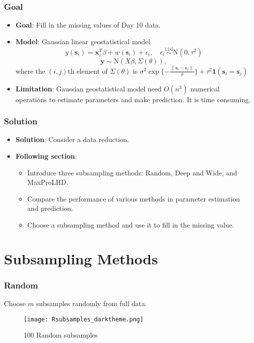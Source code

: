\documentclass{beamer}
\begin{document}
\begin{frame}
\frametitle{Goal}
\begin{itemize}
\item \textbf{Goal}: Fill in the missing values of Day 10 data.
\item \textbf{Model}: Gaussian linear geostatistical model
\begin{equation*}
y(\mathbf{s}_i)=\mathbf{x}_i^T\beta+w(\mathbf{s}_i)+\epsilon_i,\quad\epsilon_i\stackrel{\text{i.i.d}}{\sim}\mathrm{N}(0,\tau^2)
\end{equation*}
\begin{equation*}
\mathbf{y}\sim\mathrm{N}(X\beta,\Sigma(\theta)),
\end{equation*}
where the $(i,j)$th element of $\Sigma(\theta)$ is $\sigma^2\exp{\{-\frac{\|\mathbf{s}_i-\mathbf{s}_j\|}{\phi}\}}+\tau^2\mathbf{1}(\mathbf{s}_i=\mathbf{s}_j)$
\item \textbf{Limitation}: Gaussian geostatistical model need $O(n^3)$ numerical operations to estimate parameters and make prediction. It is time consuming.
\end{itemize}
\end{frame}

\begin{frame}
\frametitle{Solution}
\begin{itemize}
\item \textbf{Solution}: Consider a data reduction.
\item \textbf{Following section}:
\begin{itemize}
\item Introduce three subsampling methods: Random, Deep and Wide, and MaxProLHD.
\item Compare the performance of various methods in parameter estimation and prediction.
\item Choose a subsampling method and use it to fill in the missing value.
\end{itemize}
\end{itemize}
\end{frame}

\section{Subsampling Methods}
\begin{frame}
\frametitle{Random}
Choose $m$ subsamples randomly from full data.
\begin{figure}
\centering
\texttt{[image: Rsubsamples\_darktheme.png]}\\
\caption{100 Random subsamples}
\label{Figure 2}
\end{figure}
\end{frame}
\end{document}
